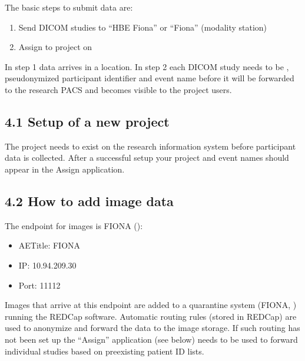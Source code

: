 \documentclass[letterpaper,10pt,english]{sphinxmanual}
\begin{document}
\sphinxAtStartPar
The basic steps to submit data are:
\begin{enumerate}
%
\item {} 
\sphinxAtStartPar
Send DICOM studies to “HBE Fiona” or “Fiona” (modality station)

\item {} 
\sphinxAtStartPar
Assign to project on 

\end{enumerate}

\sphinxAtStartPar
In step 1 data arrives in a  location. In step 2 each DICOM study needs to be , pseudonymized participant identifier and event name before it will be forwarded to the research PACS and becomes visible to the project users.


\subsection{4.1 Setup of a new project}
\label{\detokenize{EndUser/index:setup-of-a-new-project}}
\sphinxAtStartPar
The project needs to exist on the research information system before participant data is collected. After a successful setup your project and event names should appear in the Assign application.


\subsection{4.2 How to add image data}
\label{\detokenize{EndUser/index:how-to-add-image-data}}
\sphinxAtStartPar
The end\sphinxhyphen{}point for images is FIONA ():
\begin{itemize}
\item {} 
\sphinxAtStartPar
AETitle: FIONA

\item {} 
\sphinxAtStartPar
IP: 10.94.209.30

\item {} 
\sphinxAtStartPar
Port: 11112

\end{itemize}

\sphinxAtStartPar
Images that arrive at this endpoint are added to a quarantine system (FIONA, ) running the REDCap software. Automatic routing rules (stored in REDCap) are used to anonymize and forward the data to the image storage. If such routing has not been set up the “Assign” application (see below) needs to be used to forward individual studies based on pre\sphinxhyphen{}existing patient ID lists.
\end{document}
